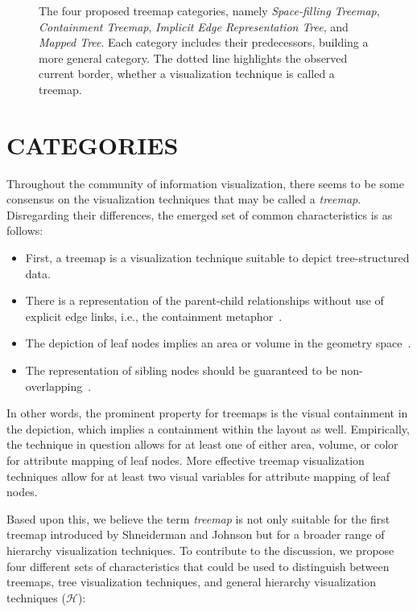\documentclass[a4paper,twoside]{article}
\newcommand*\Th{$\mathcal{H}$}
\begin{document}
\begin{figure}[t]%
	\centering
	
	\caption{The four proposed treemap categories, namely \emph{Space-filling Treemap}, \emph{Containment Treemap}, \emph{Implicit Edge Representation Tree}, and \emph{Mapped Tree}. Each category includes their predecessors, building a more general category. The dotted line highlights the observed current border, whether a visualization technique is called a treemap.}%
	\label{fig:treemap-categories}
\end{figure}
\section{\uppercase{Categories}}
\label{sec:treemapcategories}%
\noindent
Throughout the community of information visualization, there seems to be some consensus on the visualization techniques that may be called a \emph{treemap}.
Disregarding their differences, the emerged set of common characteristics is as follows:
\begin{itemize}
	\setlength{\itemsep}{0pt}
	\item First, a treemap is a visualization technique suitable to depict tree-structured data.
	\item There is a representation of the parent-child relationships without use of explicit edge links, i.e., the containment metaphor~\cite{schulz2011-implicit}.
	\item The depiction of leaf nodes implies an area or volume in the geometry space~\cite{park2018-atomgrammar}.
	\item The representation of sibling nodes should be guaranteed to be non-overlapping~\cite{johnson1991-spacefilling}.
\end{itemize}
In other words, the prominent property for treemaps is the visual containment in the depiction, which implies a containment within the layout as well.
Empirically, the technique in question allows for at least one of either area, volume, or color for attribute mapping of leaf nodes.
More effective treemap visualization techniques allow for at least two visual variables for attribute mapping of leaf nodes.
\par
Based upon this, we believe the term \emph{treemap} is not only suitable for the first treemap introduced by Shneiderman and Johnson but for a broader range of hierarchy visualization techniques.
To contribute to the discussion, we propose four different sets of characteristics that could be used to distinguish between treemaps, tree visualization techniques, and general hierarchy visualization techniques (\Th):
\end{document}
